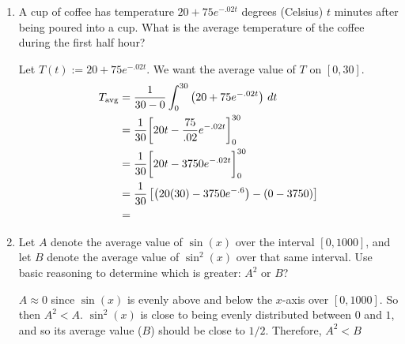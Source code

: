 \documentclass[nooutcomes]{ximera}
\begin{document}
\begin{problem}
	\begin{enumerate}
	
	\item  A cup of coffee has temperature $20 + 75e^{-.02t}$ degrees (Celsius) $t$ minutes after being poured into a cup.  
	What is the average temperature of the coffee during the first half hour?
		\begin{freeResponse}
		Let $T(t) := 20 + 75e^{-.02t}$.  We want the average value of $T$ on $[0,30]$.
			\begin{align*}
			T_{\text{avg}} &= \frac{1}{30-0} \int_0^{30} \left( 20 + 75e^{-.02t} \right) \,d t  \\
			&= \frac{1}{30} \bigg[ 20t - \frac{75}{.02} e^{-.02t} \bigg]_0^{30}  \\
			&= \frac{1}{30} \bigg[ 20t - 3750 e^{-.02t} \bigg]_0^{30}  \\
			&= \frac{1}{30} \left[ \left( 20(30) - 3750e^{-.6} \right) - (0 - 3750) \right]  \\
			&= 
			\end{align*}
		\end{freeResponse}
		
		
		
	\item  Let $A$ denote the average value of $\sin(x)$ over the interval $[0,1000]$, 
	and let $B$ denote the average value of $\sin^2(x)$ over that same interval.  
	Use basic reasoning to determine which is greater:  $A^2$ or $B$?  
		\begin{freeResponse}
		$A \approx 0$ since $\sin(x)$ is evenly above and below the $x$-axis over $[0,1000]$.  
		So then $A^2 < A$.  
		$\sin^2(x)$ is close to being evenly distributed between $0$ and $1$, and so its average value ($B$) should be close to $1/2$.  
		Therefore, $A^2 < B$
		\end{freeResponse}
		
		
		
	\end{enumerate}
		
		
		

\end{problem}
	
	
	
	
	
	
	
	
			
			
\end{document}

